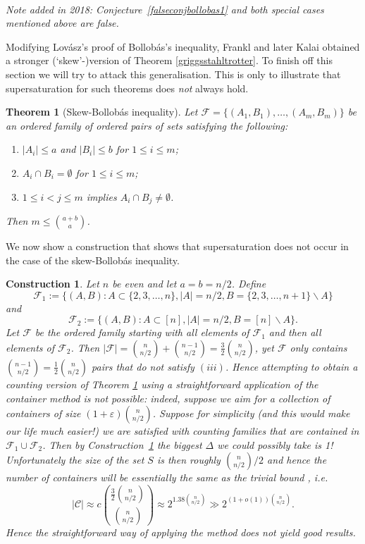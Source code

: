 \documentclass[11pt]{article}
\newtheorem{thm}[theorem]{Theorem}
\newtheorem{constru}[theorem]{Construction}
\numberwithin{equation}{section}
\def\eps{\varepsilon}
\begin{document}
~

\emph{Note added in 2018: Conjecture~\ref{falseconjbollobas1} and both special cases mentioned above are false.}

Modifying Lov\'{a}sz's proof \cite{lovaszbollobassperner} of Bollob\'{a}s's inequality, Frankl \cite{franklbollobassperner} and later Kalai \cite{kalaibollobassperner} obtained a stronger (`skew'-)version of Theorem \ref{griggsstahltrotter}. To finish off this section we will try to attack this generalisation. This is only to illustrate that supersaturation for such theorems does \emph{not} always hold.

\begin{thm}[Skew-Bollob\'{a}s inequality]\label{skewbollobas}
Let $\mathcal{F}=\{(A_1,B_1),\ldots,(A_m,B_m)\}$ be an ordered family of ordered pairs of sets satisfying the following:
\begin{enumerate}
\item[(i)] $|A_i|\leq a$ and $|B_i|\leq b$ for $1\leq i \leq m$;
\item[(ii)] $A_i\cap B_i=\emptyset$ for $1\leq i \leq m$;
\item[(iii)] $1\leq i < j \leq m $ implies $A_i\cap B_j\neq \emptyset$.
\end{enumerate}
Then $m\leq \binom{a+b}{a}$.
\end{thm}

We now show a construction that shows that supersaturation does not occur in the case of the skew-Bollob\'{a}s inequality.
\begin{constru}\label{nosupersatconstru}
 \emph{Let $n$ be even and let $a=b=n/2$. Define $$\mathcal{F}_1:=\{(A,B):A\subset \{2,3,\ldots,n\}, |A|=n/2, B=\{2,3,\ldots,n+1\}\backslash A\}$$ and $$\mathcal{F}_2:=\{(A,B): A\subset [n], |A|=n/2, B=[n]\backslash A\}.$$ Let $\mathcal{F}$ be the ordered family starting with all elements of $\mathcal{F}_1$ and then all elements of $\mathcal{F}_2$. Then $|\mathcal{F}|=\binom{n}{n/2}+\binom{n-1}{n/2}=\frac{3}{2}\binom{n}{n/2}$, yet $\mathcal{F}$ only contains $\binom{n-1}{n/2}=\frac{1}{2}\binom{n}{n/2}$ pairs that do not satisfy $(iii)$. Hence attempting to obtain a counting version of Theorem \ref{skewbollobas} using a straightforward application of the container method is not possible: indeed, suppose we aim for a collection of containers of size $(1+\eps)\binom{n}{n/2}$. Suppose for simplicity (and this would make our life }much\emph{ easier!) we are satisfied with counting families that are contained in $\mathcal{F}_1\cup \mathcal{F}_2$.  Then by Construction~\ref{nosupersatconstru} the biggest $\Delta$ we could possibly take is 1! Unfortunately the size of the set $S$ is then roughly $\binom{n}{n/2}/2$ and hence the number of containers will be essentially the same as the trivial bound , i.e. $$|\mathcal{C}|\approx c\binom{\frac32\binom{n}{n/2}}{\binom{n}{n/2}}\approx 2^{1.38\binom{n}{n/2}}\gg 2^{(1+o(1))\binom{n}{n/2}}.$$Hence the straightforward way of applying the method does not yield good results.}
\end{constru}
\end{document}
